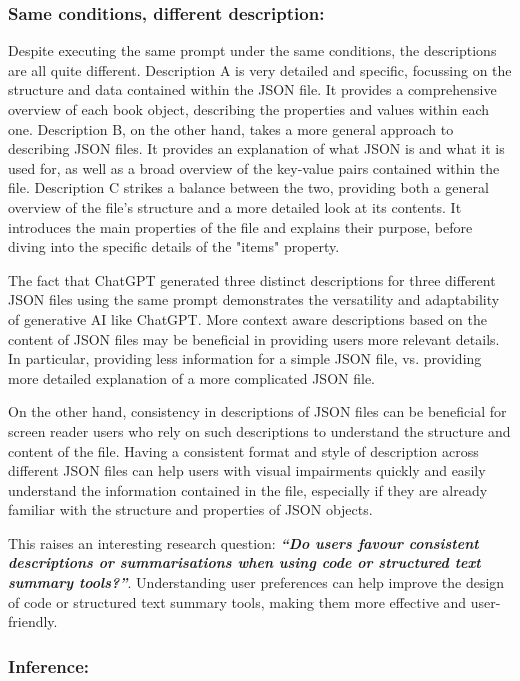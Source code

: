 \documentclass{l4proj}
\begin{document}
\subsubsection{Same conditions, different description:}

Despite executing the same prompt under the same conditions, the descriptions are all quite different. Description A is very detailed and specific, focussing on the structure and data contained within the JSON file. It provides a comprehensive overview of each book object, describing the properties and values within each one. Description B, on the other hand, takes a more general approach to describing JSON files. It provides an explanation of what JSON is and what it is used for, as well as a broad overview of the key-value pairs contained within the file. Description C strikes a balance between the two, providing both a general overview of the file's structure and a more detailed look at its contents. It introduces the main properties of the file and explains their purpose, before diving into the specific details of the "items" property.

The fact that ChatGPT generated three distinct descriptions for three different JSON files using the same prompt demonstrates the versatility and adaptability of generative AI like ChatGPT. More context aware descriptions based on the content of JSON files may be beneficial in providing users more relevant details. In particular, providing less information for a simple JSON file, vs. providing more detailed explanation of a more complicated JSON file.

On the other hand, consistency in descriptions of JSON files can be beneficial for screen reader users who rely on such descriptions to understand the structure and content of the file. Having a consistent format and style of description across different JSON files can help users with visual impairments quickly and easily understand the information contained in the file, especially if they are already familiar with the structure and properties of JSON objects. 

This raises an interesting research question: \textit{\textbf{“Do users favour consistent descriptions or summarisations when using code or structured text summary tools?”}}. Understanding user preferences can help improve the design of code or structured text summary tools, making them more effective and user-friendly.

\subsubsection{Inference:}
\end{document}
